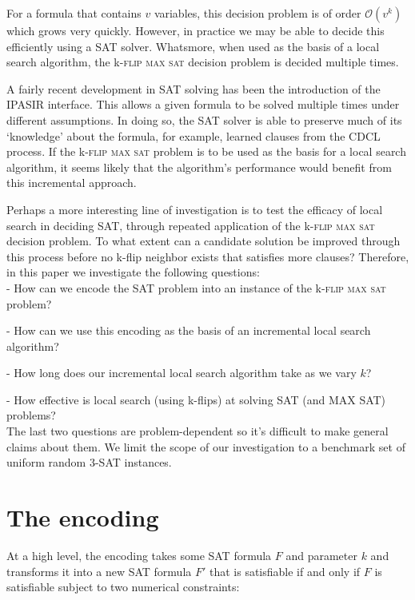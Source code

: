 \documentclass{article}
\begin{document}
\noindent For a formula that contains $v$ variables, this decision problem is
of order $\mathcal{O}(v^k)$ which grows very quickly. However, in practice we
may be able to decide this efficiently using a SAT solver. Whatsmore, when used
as the basis of a local search algorithm, the k-\textsc{flip max sat} decision
problem is decided multiple times.

A fairly recent development in SAT solving has been the introduction of the
IPASIR interface. This allows a given formula to be solved multiple times under
different assumptions. In doing so, the SAT solver is able to preserve much of
its ‘knowledge’ about the formula, for example, learned clauses from the CDCL
process. If the k-\textsc{flip max sat} problem is to be used as the basis for
a local search algorithm, it seems likely that the algorithm's performance
would benefit from this incremental approach.

Perhaps a more interesting line of investigation is to test the efficacy of
local search in deciding SAT, through repeated application of the
k-\textsc{flip max sat} decision problem. To what extent can a candidate
solution be improved through this process before no k-flip neighbor exists that
satisfies more clauses? Therefore, in this paper we investigate the following
questions: \\

- How can we encode the SAT problem into an instance of the k-\textsc{flip max sat} problem?

- How can we use this encoding as the basis of an incremental local search algorithm?

- How long does our incremental local search algorithm take as we vary $k$?

- How effective is local search (using k-flips) at solving SAT (and MAX SAT) problems? \\

\noindent The last two questions are problem-dependent so it's difficult to
make general claims about them. We limit the scope of our investigation to a
benchmark set of uniform random 3-SAT instances.

\break

\section{The encoding}

At a high level, the encoding takes some SAT formula $F$ and parameter $k$ and
transforms it into a new SAT formula $F'$ that is satisfiable if and only if
$F$ is satisfiable subject to two numerical constraints:
\end{document}
